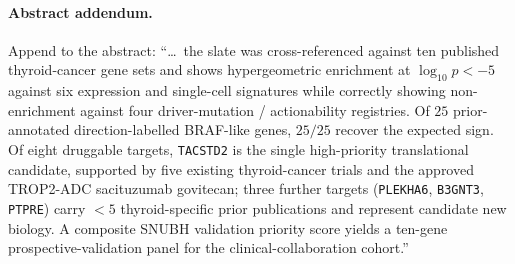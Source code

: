 \paragraph{Abstract addendum.}
Append to the abstract: ``\ldots\ the slate was cross-referenced against ten published
thyroid-cancer gene sets and shows hypergeometric enrichment at $\log_{10} p < -5$
against six expression and single-cell signatures while correctly showing non-enrichment
against four driver-mutation / actionability registries. Of $25$ prior-annotated
direction-labelled BRAF-like genes, $25/25$ recover the expected sign. Of eight
druggable targets, \texttt{TACSTD2} is the single high-priority translational candidate,
supported by five existing thyroid-cancer trials and the approved TROP2-ADC sacituzumab
govitecan; three further targets (\texttt{PLEKHA6}, \texttt{B3GNT3}, \texttt{PTPRE}) carry
$<5$ thyroid-specific prior publications and represent candidate new biology. A composite
SNUBH validation priority score yields a ten-gene prospective-validation panel for the
clinical-collaboration cohort.''

